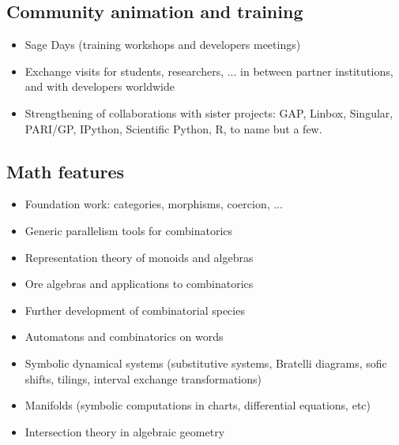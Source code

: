 \subsection{Community animation and training}

\begin{itemize}
\item Sage Days (training workshops and developers meetings)
\item Exchange visits for students, researchers, ... in between
  partner institutions, and with developers worldwide
\item Strengthening of collaborations with sister projects: GAP,
  Linbox, Singular, PARI/GP, IPython, Scientific Python, R, to name but a
  few.
\end{itemize}



\subsection{Math features}

\begin{itemize}
\item Foundation work: categories, morphisms, coercion, ...
\item Generic parallelism tools for combinatorics
\item Representation theory of monoids and algebras
\item Ore algebras and applications to combinatorics
\item Further development of combinatorial species
\item Automatons and combinatorics on words
\item Symbolic dynamical systems (substitutive systems, Bratelli diagrams,
  sofic shifts, tilings, interval exchange transformations)
\item Manifolds (symbolic computations in charts, differential equations, etc)
\item Intersection theory in algebraic geometry
\end{itemize}

